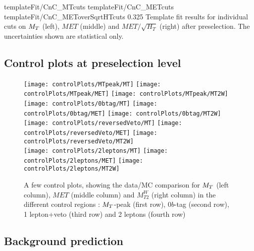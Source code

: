                            {templateFit/CnC_MTcuts}
                           {templateFit/CnC_METcuts}
                           {templateFit/CnC_METoverSqrtHTcuts}
                           {0.325}
                           {Template fit results for individual cuts on $M_T$ (left), $MET$ (middle) and $MET/\sqrt{H_T}$ (right) after preselection. The uncertainties shown are statistical only.}
 
        \subsection{Control plots at preselection level}

            \begin{figure}[h!]
                \centering
                \texttt{[image: controlPlots/MTpeak/MT]}
                \texttt{[image: controlPlots/MTpeak/MET]}
                \texttt{[image: controlPlots/MTpeak/MT2W]}\\
                \texttt{[image: controlPlots/0btag/MT]}
                \texttt{[image: controlPlots/0btag/MET]}
                \texttt{[image: controlPlots/0btag/MT2W]}\\
                \texttt{[image: controlPlots/reversedVeto/MT]}
                \texttt{[image: controlPlots/reversedVeto/MET]}
                \texttt{[image: controlPlots/reversedVeto/MT2W]}\\
                \texttt{[image: controlPlots/2leptons/MT]}
                \texttt{[image: controlPlots/2leptons/MET]}
                \texttt{[image: controlPlots/2leptons/MT2W]}\\
                \caption{A few control plots, showing the data/MC comparison for $M_T$ (left column), $MET$ (middle column) and $M_{T2}^W$ (right column) in the different control regions : $M_T$-peak (first row), $0b$-tag (second row), 1 lepton+veto (third row) and 2 leptons (fourth row)}
                \label{fig:derpi}
            \end{figure}

        \subsection{Background prediction}

